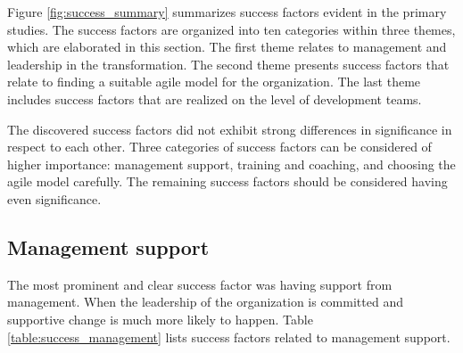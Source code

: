Figure \ref{fig:success_summary} summarizes success factors evident in the
primary studies. The success factors are organized into ten categories within
three themes, which are elaborated in this section. The first theme relates to
management and leadership in the transformation. The second theme presents
success factors that relate to finding a suitable agile model for the
organization. The last theme includes success factors that are realized on the
level of development teams.

The discovered success factors did not exhibit strong differences in
significance in respect to each other. Three categories of success factors can
be considered of higher importance: management support, training and coaching,
and choosing the agile model carefully. The remaining success factors should be
considered having even significance.

% 
% 
% 


\subsection{Management support}

The most prominent and clear success factor was having support from management.
When the leadership of the organization is committed and supportive change is
much more likely to happen. Table \ref{table:success_management} lists
success factors related to management support.

